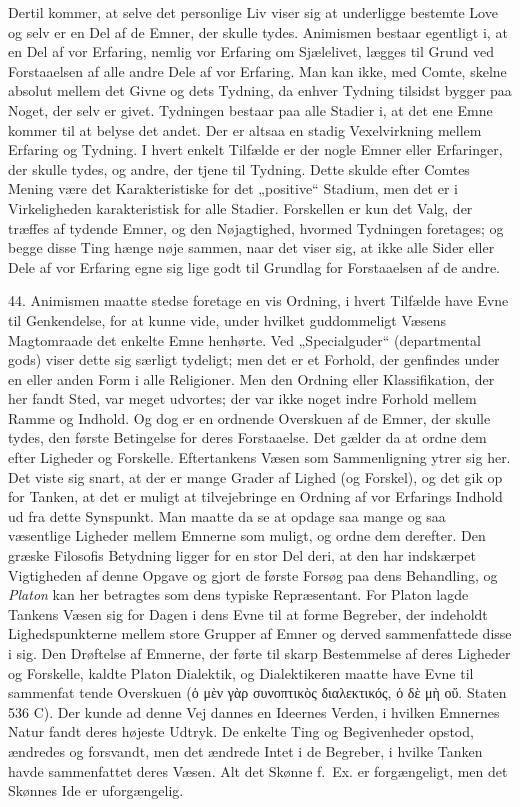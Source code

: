 \documentclass[12pt,a4paper]{book}
\newcommand{\opage}[1]{\marginnote{\footnotesize\textit{[#1]}}}
\newcommand{\apage}[1]{\marginnote{\footnotesize\textit{[#1]}}}
\begin{document}
Dertil kommer, at selve det personlige Liv viser sig at underligge
bestemte Love og selv er en Del af de Emner, der skulle tydes. Animismen
bestaar egentligt i, at en Del af vor Erfaring, nemlig vor Erfaring om
Sjælelivet, lægges til Grund ved Forstaaelsen af alle andre Dele af vor
Erfaring. Man kan ikke, med Comte, skelne absolut mellem det Givne og
dets Tydning, da enhver Tydning tilsidst bygger paa Noget, der selv er
givet. Tydningen bestaar paa alle Stadier i, at det ene Emne kommer til
at belyse det andet. Der er altsaa en stadig Vexelvirkning mellem
Erfaring og \apage{118} Tydning. I hvert enkelt Tilfælde er der nogle Emner eller
Erfaringer, der skulle tydes, og andre, der tjene til Tydning. Dette
skulde efter Comtes Mening være det Karakteristiske for det „positive“
Stadium, men det er i Virkeligheden karakteristisk for alle Stadier.
Forskellen er kun det Valg, der træffes af tydende Emner, og den
Nøjagtighed, hvormed Tydningen foretages; og begge disse Ting hænge nøje
sammen, naar det viser sig, at ikke alle Sider eller Dele af vor
Erfaring egne sig lige godt til Grundlag for Forstaaelsen af de andre.

44. Animismen maatte stedse foretage en vis Ordning, i hvert Tilfælde
have Evne til Genkendelse, for at kunne vide, under hvilket guddommeligt
Væsens Magtomraade det enkelte Emne henhørte. Ved „Specialguder“
(departmental gods) viser dette sig særligt tydeligt; men det er et
Forhold, der genfindes under en eller anden Form i alle Religioner. Men
den Ordning eller Klassifikation, der her fandt Sted, var meget
udvortes; der var ikke noget indre Forhold mellem Ramme og Indhold. Og
dog er en ordnende Overskuen af de Emner, der skulle tydes, den første
Betingelse for deres Forstaaelse. Det gælder da at ordne dem efter
Ligheder og Forskelle. Eftertankens Væsen som Sammenligning ytrer sig
her. Det viste sig snart, at der er mange Grader af Lighed (og Forskel),
og det gik op for Tanken, at det er muligt at tilvejebringe en Ordning
af vor Erfarings Indhold ud fra dette Synspunkt. Man maatte da se at
opdage saa mange og saa væsentlige Ligheder mellem Emnerne som muligt,
og ordne dem derefter. Den græske Filosofis Betydning ligger for en stor
Del deri, at den har indskærpet Vigtigheden af denne Opgave og gjort de
første Forsøg paa dens Behandling, og \emph{Platon} kan her betragtes
som dens typiske Repræsentant. For Platon lagde Tankens Væsen sig for
Dagen i dens Evne til at forme Begreber, der indeholdt Lighedspunkterne
mellem store Grupper af Emner og derved sammenfattede disse i sig. Den
Drøftelse af Emnerne, der førte til skarp Bestemmelse af deres Ligheder
og Forskelle, kaldte Platon Dialektik, og Dialektikeren maatte have Evne
til sammenfat%
\opage{119}tende Overskuen (ὁ μὲν γὰρ συνοπτικὸς διαλεκτικός, ὁ δὲ μὴ
οὔ. Staten 536 C). Der kunde ad denne Vej dannes en Ideernes Verden, i
hvilken Emnernes Natur fandt deres højeste Udtryk. De enkelte Ting og
Begivenheder opstod, ændredes og forsvandt, men det ændrede Intet i de
Begreber, i hvilke Tanken havde sammenfattet deres Væsen. Alt det Skønne
f.\ Ex. er forgængeligt, men det Skønnes Ide er uforgængelig.
\end{document}

